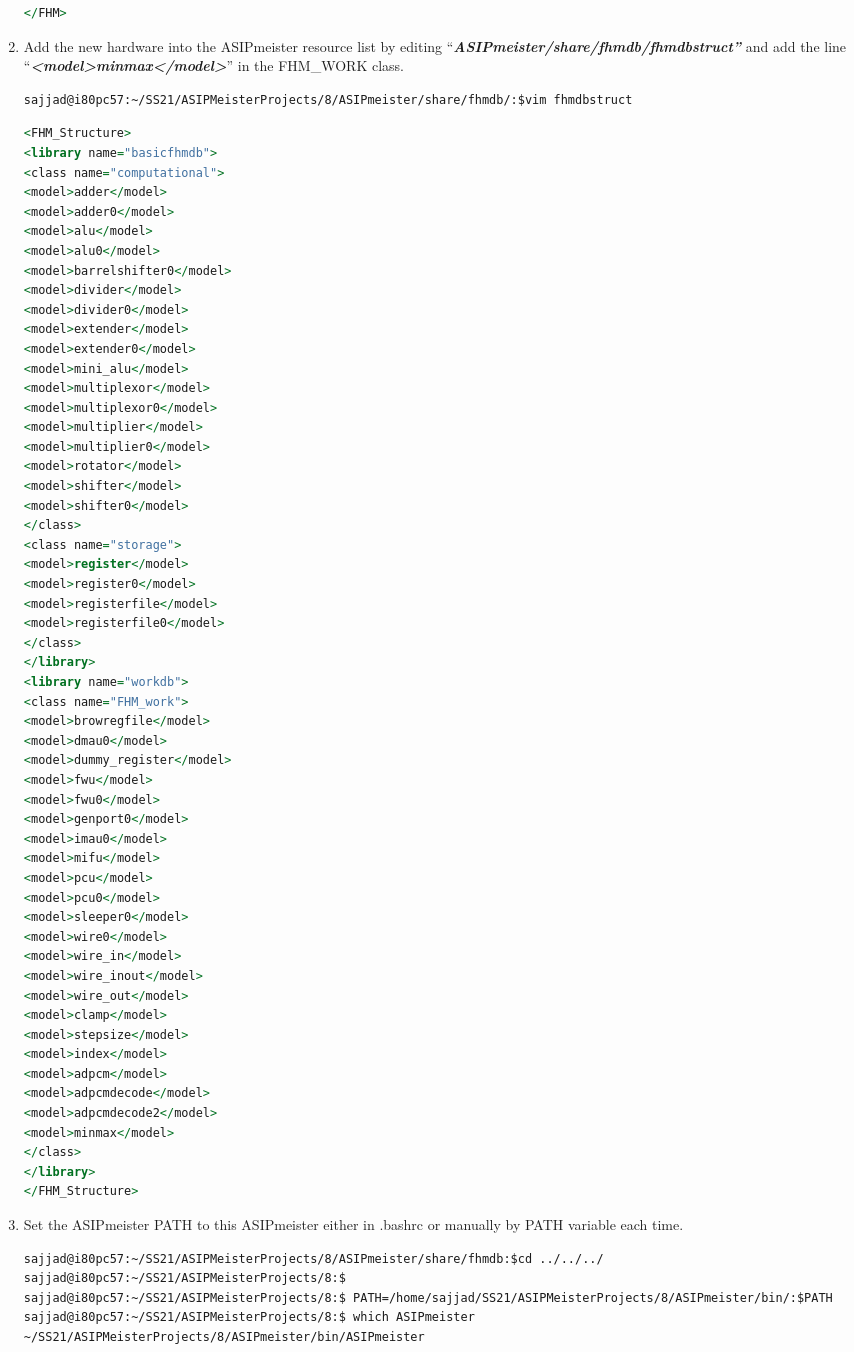 \begin{enumerate}[resume]
\begin{lstlisting}[language=vhdl,caption={"minmax.fhm"},captionpos=t]
	</FHM>
\end{lstlisting}
\item Add the new hardware into the ASIPmeister resource list by editing
``\emph{\textbf{ASIPmeister/share/fhmdb/}}\emph{\textbf{fhmdbstruct''}}
and add the line
``\emph{\textbf{\textless model\textgreater minmax\textless/model\textgreater{}}}''
in the FHM\_WORK class.
\begin{lstlisting}
sajjad@i80pc57:~/SS21/ASIPMeisterProjects/8/ASIPmeister/share/fhmdb/:$vim fhmdbstruct
\end{lstlisting}
\begin{lstlisting}[language=vhdl,caption={"fhmdbstruct"},captionpos=t]
<FHM_Structure>
<library name="basicfhmdb">
<class name="computational">
<model>adder</model>
<model>adder0</model>
<model>alu</model>
<model>alu0</model>
<model>barrelshifter0</model>
<model>divider</model>
<model>divider0</model>
<model>extender</model>
<model>extender0</model>
<model>mini_alu</model>
<model>multiplexor</model>
<model>multiplexor0</model>
<model>multiplier</model>
<model>multiplier0</model>
<model>rotator</model>
<model>shifter</model>
<model>shifter0</model>
</class>
<class name="storage">
<model>register</model>
<model>register0</model>
<model>registerfile</model>
<model>registerfile0</model>
</class>
</library>
<library name="workdb">
<class name="FHM_work">
<model>browregfile</model>
<model>dmau0</model>
<model>dummy_register</model>
<model>fwu</model>
<model>fwu0</model>
<model>genport0</model>
<model>imau0</model>
<model>mifu</model>
<model>pcu</model>
<model>pcu0</model>
<model>sleeper0</model>
<model>wire0</model>
<model>wire_in</model>
<model>wire_inout</model>
<model>wire_out</model>
<model>clamp</model>
<model>stepsize</model>
<model>index</model>
<model>adpcm</model>
<model>adpcmdecode</model>
<model>adpcmdecode2</model>
<model>minmax</model>
</class>
</library>
</FHM_Structure>
\end{lstlisting}
\item Set the ASIPmeister PATH to this ASIPmeister either in .bashrc or manually by PATH variable each time.
\begin{lstlisting}
sajjad@i80pc57:~/SS21/ASIPMeisterProjects/8/ASIPmeister/share/fhmdb:$cd ../../../
sajjad@i80pc57:~/SS21/ASIPMeisterProjects/8:$
sajjad@i80pc57:~/SS21/ASIPMeisterProjects/8:$ PATH=/home/sajjad/SS21/ASIPMeisterProjects/8/ASIPmeister/bin/:$PATH
sajjad@i80pc57:~/SS21/ASIPMeisterProjects/8:$ which ASIPmeister
~/SS21/ASIPMeisterProjects/8/ASIPmeister/bin/ASIPmeister
\end{lstlisting}
\end{enumerate}
